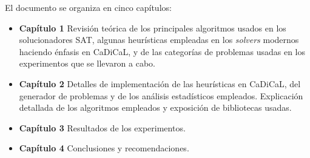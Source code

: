 El documento se organiza en cinco capítulos:
\begin{itemize}
    \item \textbf{Cap\'itulo 1} Revisión teórica de los principales algoritmos usados en los solucionadores SAT, algunas heur\'isticas empleadas en los \textit{solvers} modernos haciendo \'enfasis en CaDiCaL, y de las categor\'ias de problemas usadas en los experimentos que se llevaron a cabo.
    \item \textbf{Cap\'itulo 2} Detalles de implementaci\'on de las heur\'isticas en CaDiCaL, del generador de problemas y de los an\'alisis estad\'isticos empleados. Explicaci\'on detallada de los algoritmos empleados y exposici\'on de bibliotecas usadas.
    \item \textbf{Cap\'itulo 3} Resultados de los experimentos.
    \item \textbf{Cap\'itulo 4} Conclusiones y recomendaciones.
\end{itemize}

